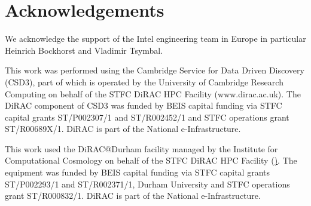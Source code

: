 \documentclass[main]{subfiles}
\begin{document}
\section{Acknowledgements}\label{sec:acknowledgments}
We acknowledge the support of the Intel engineering team in Europe in particular Heinrich Bockhorst and Vladimir Tsymbal.

This work was performed using the Cambridge Service for Data Driven Discovery (CSD3), part of which is operated by the University of Cambridge Research Computing on behalf of the STFC DiRAC HPC Facility (www.dirac.ac.uk).
The DiRAC component of CSD3 was funded by BEIS capital funding via STFC capital grants ST/P002307/1 and ST/R002452/1 and STFC operations grant ST/R00689X/1.
DiRAC is part of the National e-Infrastructure.

This work used the DiRAC@Durham facility managed by the Institute for Computational Cosmology on behalf of the STFC DiRAC HPC Facility (\href{https://www.dirac.ac.uk/}).
The equipment was funded by BEIS capital funding via STFC capital grants ST/P002293/1 and ST/R002371/1, Durham University and STFC operations grant ST/R000832/1.
DiRAC is part of the National e-Infrastructure.
\end{document}
